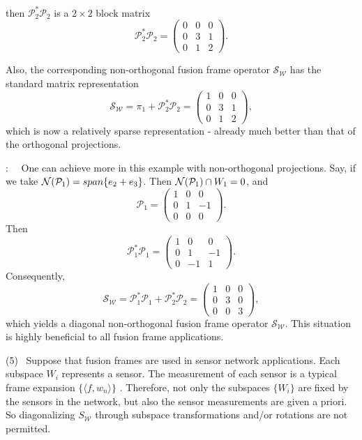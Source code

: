 \documentclass[11pt,reqno]{amsart}
\theoremstyle{remark}
\begin{document}
then ${{\mathcal P}}_2^*{{\mathcal P}}_2$ is a $2\times 2$ block matrix
\[
{{\mathcal P}}_2^*{{\mathcal P}}_2 =\left(\begin{array}{ccc}
  0 & 0 & 0 \\
  0 & 3 & 1 \\
  0 & 1 & 2\end{array}\right).
\]

Also, the corresponding non-orthogonal fusion frame operator ${{\mathcal S}_{{\mathcal W}}}$ has the standard matrix representation
\[
{{\mathcal S}_{{\mathcal W}}} =\pi_1 + {{\mathcal P}}_2^*{{\mathcal P}}_2 =\left(\begin{array}{ccc}
 1 & 0 & 0 \\
 0 & 3 & 1 \\
 0 & 1 & 2\end{array}\right),
\]
which is now a relatively sparse representation - already
much better than that of the orthogonal projections.
\smallskip
\smallskip

:  \ \ One can achieve more in this example with non-orthogonal projections.  Say, if we take ${\displaystyle} {{\mathcal N}}({{\mathcal P}}_1)=span\{e_2 +e_3\}$.  Then ${\displaystyle} {{\mathcal N}}({{\mathcal P}}_1)\cap W_1={0}$, and
\[
{{\mathcal P}}_1 =\left(\begin{array}{ccc}
  1 & 0 & 0 \\
  0 & 1 & -1 \\
  0 & 0 & 0\end{array}\right).
\]
Then
\[
{{\mathcal P}}_1^*{{\mathcal P}}_1 =\left(\begin{array}{ccc}
  1 & 0 & 0 \\
  0 & 1 & -1 \\
  0 & -1 & 1\end{array}\right).
\]
Consequently,
\[
{{\mathcal S}_{{\mathcal W}}} ={{\mathcal P}}_1^*{{\mathcal P}}_1 + {{\mathcal P}}_2^*{{\mathcal P}}_2 =\left(\begin{array}{ccc}
 1 & 0 & 0 \\
 0 & 3 & 0 \\
 0 & 0 & 3\end{array}\right),
\]
which yields a diagonal non-orthogonal fusion frame operator ${{\mathcal S}_{{\mathcal W}}}$.   This situation is highly beneficial to all fusion frame applications.

(5) \ Suppose that fusion frames are used in sensor network applications.  Each subspace $W_i$ represents a sensor.   The measurement of each sensor is a typical frame expansion $\{{\langle} f, w_n{\rangle}\}$ \cite{LiYan08}.  Therefore, not only the subspaces $\{W_i\}$ are fixed by the sensors in the network, but also the sensor measurements are given a priori.  So diagonalizing $S_{{\mathcal W}}$ through subspace transformations and/or rotations are not permitted.
\end{document}
